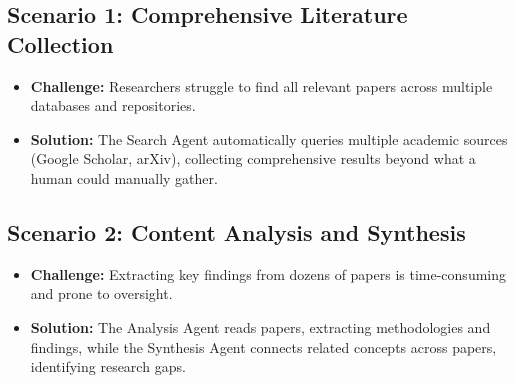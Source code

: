 \documentclass{article}
\begin{document}
\subsection*{Scenario 1: Comprehensive Literature Collection}
\begin{itemize}[leftmargin=0.5in]
  \item \textbf{Challenge:} Researchers struggle to find all relevant papers across multiple databases and repositories.
  \item \textbf{Solution:} The Search Agent automatically queries multiple academic sources (Google Scholar, arXiv), collecting comprehensive results beyond what a human could manually gather.
\end{itemize}


\subsection*{Scenario 2: Content Analysis and Synthesis}
\begin{itemize}[leftmargin=0.5in]
  \item \textbf{Challenge:} Extracting key findings from dozens of papers is time-consuming and prone to oversight.
  \item \textbf{Solution:} The Analysis Agent reads papers, extracting methodologies and findings, while the Synthesis Agent connects related concepts across papers, identifying research gaps.
\end{itemize}
\end{document}
